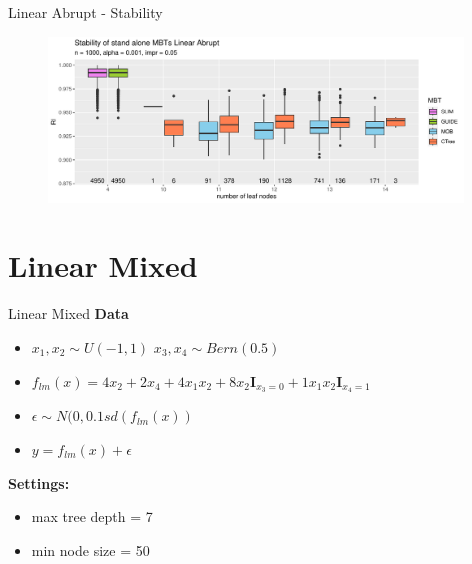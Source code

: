 \documentclass[9pt, xcolor=table]{beamer}
\begin{document}
\begin{frame}{Linear Abrupt - Stability}
\begin{figure}
    \includegraphics[width=11cm]{Figures/simulations/batchtools/basic_scenarios/linear_abrupt/la_1000_standalone_sta.pdf}
\end{figure}     
\end{frame}


\section{Linear Mixed}
\begin{frame}{Linear Mixed}
\textbf{Data}
\begin{itemize}
    \item $x_1,x_2 \sim U(-1,1)$  $x_3, x_4 \sim Bern(0.5)$
    \item $ f_{lm}(x) = 4 x_2 + 2 x_4 + 4 x_1 x_2 + 8 x_2 \mathbf{I}_{x_3 = 0} + 1 x_1 x_2 \mathbf{I}_{x_4 = 1}  $
    \item $\epsilon \sim N(0, 0.1 sd(f_{lm}(x))$
    \item $y = f_{lm}(x) + \epsilon$
\end{itemize}

\textbf{Settings:}
\begin{itemize}
    \item max tree depth = 7 
    \item min node size = 50    
\end{itemize}

\end{frame}   
\end{document}
